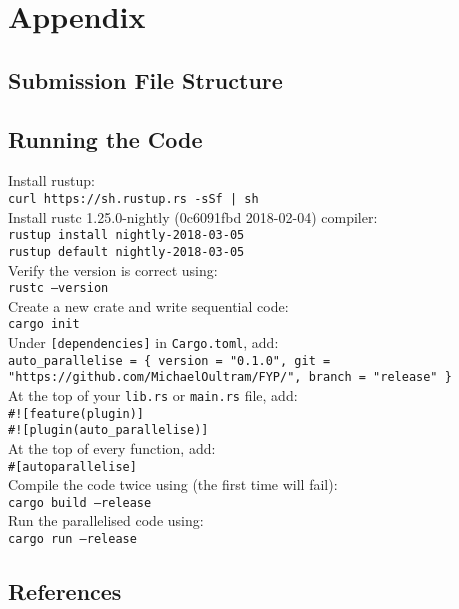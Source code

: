 \chapter{Appendix}
\section{Submission File Structure}

\section{Running the Code}
Install rustup: \\
\texttt{curl https://sh.rustup.rs -sSf | sh} \\

Install rustc 1.25.0-nightly (0c6091fbd 2018-02-04) compiler: \\
\texttt{rustup install nightly-2018-03-05} \\
\texttt{rustup default nightly-2018-03-05} \\

Verify the version is correct using: \\
\texttt{rustc --version} \\

Create a new crate and write sequential code: \\
\texttt{cargo init} \\

Under \texttt{[dependencies]} in \texttt{Cargo.toml}, add: \\
\texttt{auto\_parallelise = \{ version = "0.1.0", git = "https://github.com/MichaelOultram/FYP/", branch = "release" \}} \\

At the top of your \texttt{lib.rs} or \texttt{main.rs} file, add: \\
\texttt{\#![feature(plugin)]} \\
\texttt{\#![plugin(auto\_parallelise)]} \\

At the top of every function, add: \\
\texttt{\#[autoparallelise]} \\

Compile the code twice using (the first time will fail): \\
\texttt{cargo build --release} \\

Run the parallelised code using: \\
\texttt{cargo run --release}

\section{References}
\printbibliography[heading=none]

%
%
